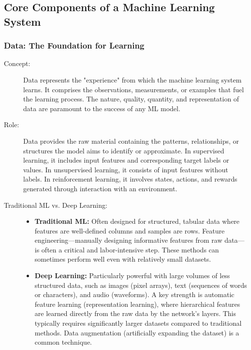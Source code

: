 \documentclass{article}
\begin{document}
\subsection{Core Components of a Machine Learning System}

\subsubsection{Data: The Foundation for Learning}
\begin{description}
    \item[Concept:] Data represents the "experience" from which the machine learning system learns. It comprises the observations, measurements, or examples that fuel the learning process. The nature, quality, quantity, and representation of data are paramount to the success of any ML model.

    \item[Role:] Data provides the raw material containing the patterns, relationships, or structures the model aims to identify or approximate. In supervised learning, it includes input features and corresponding target labels or values. In unsupervised learning, it consists of input features without labels. In reinforcement learning, it involves states, actions, and rewards generated through interaction with an environment.

    \item[Traditional ML vs. Deep Learning:]
        \begin{itemize}
            \item \textbf{Traditional ML:} Often designed for structured, tabular data where features are well-defined columns and samples are rows. Feature engineering---manually designing informative features from raw data---is often a critical and labor-intensive step. These methods can sometimes perform well even with relatively small datasets.
            \item \textbf{Deep Learning:} Particularly powerful with large volumes of less structured data, such as images (pixel arrays), text (sequences of words or characters), and audio (waveforms). A key strength is automatic feature learning (representation learning), where hierarchical features are learned directly from the raw data by the network's layers. This typically requires significantly larger datasets compared to traditional methods. Data augmentation (artificially expanding the dataset) is a common technique.
        \end{itemize}
\end{description}
\end{document}
